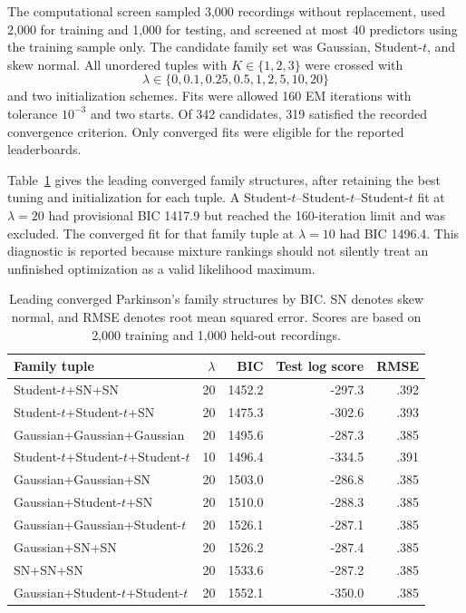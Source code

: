 \documentclass{article}
\begin{document}
The computational screen sampled 3,000 recordings without replacement, used
2,000 for training and 1,000 for testing, and screened at most 40 predictors
using the training sample only.  The candidate family set was Gaussian,
Student-$t$, and skew normal.  All unordered tuples with
\(K\in\{1,2,3\}\) were crossed with
\[
  \lambda\in\{0,0.1,0.25,0.5,1,2,5,10,20\}
\]
and two initialization schemes.  Fits were allowed 160 EM iterations with
tolerance \(10^{-3}\) and two starts.  Of 342 candidates, 319 satisfied the
recorded convergence criterion.  Only converged fits were eligible for the
reported leaderboards.

Table~\ref{tab:supp_park_bic} gives the leading converged family structures,
after retaining the best tuning and initialization for each tuple.  A
Student-$t$--Student-$t$--Student-$t$ fit at \(\lambda=20\) had provisional
BIC 1417.9 but reached the 160-iteration limit and was excluded.  The converged
fit for that family tuple at \(\lambda=10\) had BIC 1496.4.  This diagnostic
is reported because mixture rankings should not silently treat an unfinished
optimization as a valid likelihood maximum.

\begin{table}[htbp]
\centering
\caption{Leading converged Parkinson's family structures by BIC.  SN denotes
skew normal, and RMSE denotes root mean squared error.  Scores are based on
2,000 training and 1,000 held-out recordings.}
\label{tab:supp_park_bic}
\small
\begin{tabular}{lrrrr}
\toprule
Family tuple & \(\lambda\) & BIC & Test log score & RMSE \\
\midrule
Student-\(t\)+SN+SN & 20 & 1452.2 & -297.3 & .392 \\
Student-\(t\)+Student-\(t\)+SN & 20 & 1475.3 & -302.6 & .393 \\
Gaussian+Gaussian+Gaussian & 20 & 1495.6 & -287.3 & .385 \\
Student-\(t\)+Student-\(t\)+Student-\(t\) & 10 & 1496.4 & -334.5 & .391 \\
Gaussian+Gaussian+SN & 20 & 1503.0 & -286.8 & .385 \\
Gaussian+Student-\(t\)+SN & 20 & 1510.0 & -288.3 & .385 \\
Gaussian+Gaussian+Student-\(t\) & 20 & 1526.1 & -287.1 & .385 \\
Gaussian+SN+SN & 20 & 1526.2 & -287.4 & .385 \\
SN+SN+SN & 20 & 1533.6 & -287.2 & .385 \\
Gaussian+Student-\(t\)+Student-\(t\) & 20 & 1552.1 & -350.0 & .385 \\
\bottomrule
\end{tabular}
\end{table}
\end{document}
